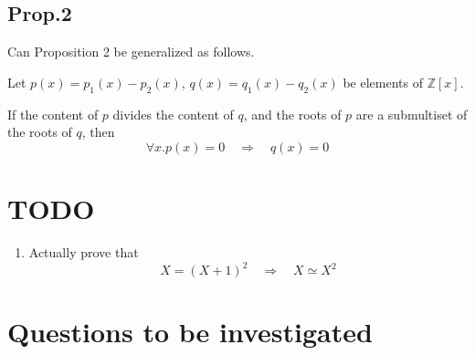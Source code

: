 \documentclass[letterpaper,numbers=enddot]{scrartcl}
\newcommand{\then}{\quad\mathrel{\Longrightarrow}\quad}
\newcommand{\ints}{\mathbb{Z}}
\begin{document}
\subsection{Prop.2}

Can Proposition 2 be generalized as follows.

Let $p(x) = p_1(x)- p_2(x)$, $q(x) = q_1(x)-q_2(x)$ be elements of $\ints[x]$.

If the content of $p$ divides the content of $q$, and
the roots of $p$ are a submultiset of the roots of $q$, then
\[ \forall x. p(x)=0 \then q(x) = 0 \]

\newpage

\section*{TODO}

\begin{enumerate}
  \item Actually prove that
  \[ X=(X+1)^2 \then X \simeq X^2 \]
\end{enumerate}

\newpage
\section{Questions to be investigated}
\end{document}
